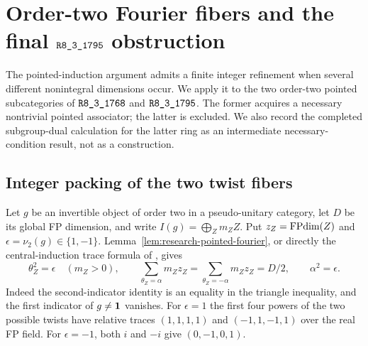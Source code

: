 \section{Order-two Fourier fibers and the final $\sha{R8_3_1795}$ obstruction}
\label{sec:m3-pointed-followup}

The pointed-induction argument admits a finite integer refinement when
several different nonintegral dimensions occur.  We apply it to the two
order-two pointed subcategories of $\sha{R8_3_1768}$ and
$\sha{R8_3_1795}$.  The former acquires a necessary nontrivial pointed
associator; the latter is excluded.  We also record the completed
subgroup-dual calculation for the latter ring as an intermediate
necessary-condition result, not as a construction.

\subsection{Integer packing of the two twist fibers}

Let $g$ be an invertible object of order two in a pseudo-unitary category,
let $D$ be its global FP dimension, and write $I(g)=\bigoplus_Zm_ZZ$.
Put $z_Z=\operatorname{FPdim}(Z)$ and $\epsilon=\nu_2(g)\in\{1,-1\}$.
Lemma~\ref{lem:research-pointed-fourier}, or directly the central-induction
trace formula of \cite[Theorem~4.1]{NgIndicators}, gives
\begin{equation}\label{eq:pointed-c2-masses}
 \theta_Z^2=\epsilon\quad(m_Z>0),\qquad
 \sum_{\theta_Z=\alpha}m_Zz_Z
 =\sum_{\theta_Z=-\alpha}m_Zz_Z=D/2,
 \qquad \alpha^2=\epsilon.
\end{equation}
Indeed the second-indicator identity is an equality in the triangle
inequality, and the first indicator of $g\ne\mathbf1$ vanishes.
For $\epsilon=1$ the first four powers of the two possible twists have
relative traces $(1,1,1,1)$ and $(-1,1,-1,1)$ over the real FP field.
For $\epsilon=-1$, both $i$ and $-i$ give $(0,-1,0,1)$.

